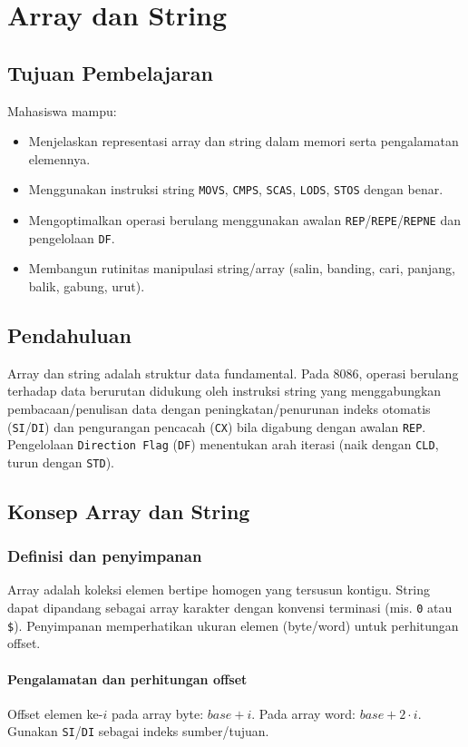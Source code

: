 \documentclass[../main.tex]{subfiles}
\begin{document}
\chapter{Array dan String}

\section{Tujuan Pembelajaran}
Mahasiswa mampu:
\begin{itemize}
    \item Menjelaskan representasi array dan string dalam memori serta pengalamatan elemennya.
    \item Menggunakan instruksi string \texttt{MOVS}, \texttt{CMPS}, \texttt{SCAS}, \texttt{LODS}, \texttt{STOS} dengan benar.
    \item Mengoptimalkan operasi berulang menggunakan awalan \texttt{REP}/\texttt{REPE}/\texttt{REPNE} dan pengelolaan \texttt{DF}.
    \item Membangun rutinitas manipulasi string/array (salin, banding, cari, panjang, balik, gabung, urut).
\end{itemize}

\section{Pendahuluan}
Array dan string adalah struktur data fundamental. Pada 8086, operasi berulang terhadap data berurutan didukung oleh instruksi string yang menggabungkan pembacaan/penulisan data dengan peningkatan/penurunan indeks otomatis (\texttt{SI}/\texttt{DI}) dan pengurangan pencacah (\texttt{CX}) bila digabung dengan awalan \texttt{REP}. Pengelolaan \texttt{Direction Flag} (\texttt{DF}) menentukan arah iterasi (naik dengan \texttt{CLD}, turun dengan \texttt{STD}).

\section{Konsep Array dan String}
\subsection{Definisi dan penyimpanan}
Array adalah koleksi elemen bertipe homogen yang tersusun kontigu. String dapat dipandang sebagai array karakter dengan konvensi terminasi (mis. \texttt{0} atau \texttt{\$}). Penyimpanan memperhatikan ukuran elemen (byte/word) untuk perhitungan offset.

\subsubsection{Pengalamatan dan perhitungan offset}
Offset elemen ke-\(i\) pada array byte: \(base + i\). Pada array word: \(base + 2\cdot i\). Gunakan \texttt{SI}/\texttt{DI} sebagai indeks sumber/tujuan.
\end{document}
